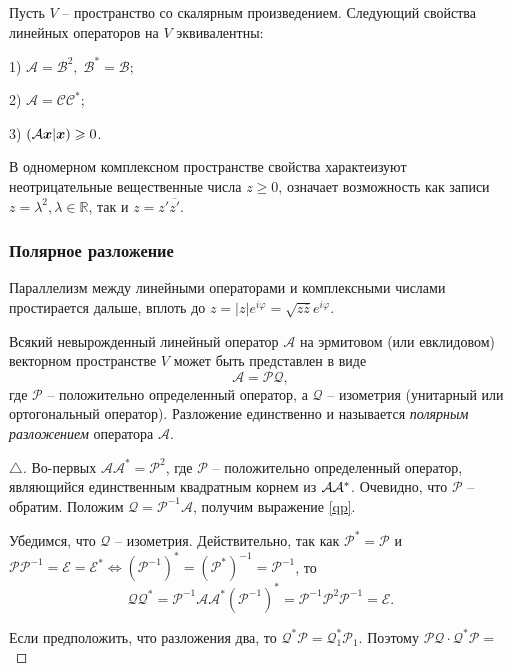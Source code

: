 \begin{to_thr} 
    Пусть $V$ -- пространство со скалярным произведением. Следующий свойства линейных операторов на $V$ эквивалентны:

    1) $\mathcal A = \mathcal B^2, \; \mathcal B^* = \mathcal B$;

    2) $\mathcal A = \mathcal C \mathcal C^*$;

    3) $(\mathcal A \mbox{\boldmath $x$} | \mbox{\boldmath $x$} ) \geqslant 0$. 
\end{to_thr}

В одномерном комплексном пространстве свойства характеизуют неотрицательные вещественные числа $z \geq 0$, означает возможность как записи $z = \lambda^2, \lambda \in \mathbb{R}$, так и $z = z' \overline{z'}$.


\subsubsection{Полярное разложение}

Параллелизм между линейными операторами и комплексными числами простирается дальше, вплоть до $z = |z| e^{i \varphi} = \sqrt{z \overline{z}} e^{i \varphi}$.

\begin{to_thr} 
    Всякий невырожденный линейный оператор $\mathcal A$ на эрмитовом (или евклидовом) векторном пространстве $V$ может быть представлен в виде 
    \begin{equation}
    \label{qp}
        \mathcal A = \mathcal P \mathcal Q,
    \end{equation}
    где $\mathcal P$ -- положительно определенный оператор, а $\mathcal Q$ -- изометрия (унитарный или ортогональный оператор). Разложение единственно и называется \textit{полярным разложением} оператора $\mathcal A.$ 
\end{to_thr}



\begin{proof}[$\triangle$]
    Во-первых $\mathcal A \mathcal A^* = \mathcal P^2$, где $\mathcal P$ -- положительно определенный оператор, являющийся единственным квадратным корнем из $\mathcal A \mathcal A^*$. Очевидно, что $\mathcal P$ -- обратим. Положим $\mathcal Q = \mathcal P^{-1} \mathcal A$, получим выражение \eqref{qp}.  

    Убедимся, что $\mathcal Q$ -- изометрия. Действительно, так как $\mathcal P^* = \mathcal P$ и $\mathcal P \mathcal P^{-1} = \mathcal E = \mathcal E^* \Longleftrightarrow \left(\mathcal P^{-1} \right)^* = \left(\mathcal P^*\right)^{-1} = \mathcal P^{-1}$, то
    $$
        \mathcal Q \mathcal Q^*= \mathcal P^{-1} \mathcal A \mathcal A^* \left(\mathcal P^{-1}\right)^* = \mathcal P^{-1} \mathcal P^2 \mathcal P^{-1} = \mathcal E.
    $$

    Если предположить, что разложения два, то $\mathcal Q^* \mathcal P = \mathcal Q_{1}^* \mathcal P_{1}$. Поэтому $\mathcal P \mathcal Q \cdot \mathcal Q^* \mathcal P = $
\end{proof}

